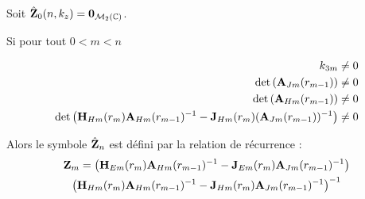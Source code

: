         \begin{thm}
            Soit \(\hat {\mathbf{Z}}_0(n,k_z) = \mathbf{0}_{\mathcal{M}_2(\mathbb C)}\).

            Si pour tout \(0 < m < n\)

            \begin{subequations}
                \begin{align}
                    k_{3m} & \not = 0 \\
                    \det\left(\mathbf{A}_{Jm}(r_{m-1})\right) & \not = 0 \\
                    \det\left(\mathbf{A}_{Hm}(r_{m-1})\right) & \not = 0 \\
                    \det\left(\mathbf{H}_{Hm}(r_{m})\mathbf{A}_{Hm}(r_{m-1})^{-1} - \mathbf{J}_{Hm}(r_{m})(\mathbf{A}_{Jm}(r_{m-1}))^{-1}\right) &\not = 0
                \end{align}
            \end{subequations}

            Alors le symbole \(\hat {\mathbf{Z}}_n\) est défini par la relation de récurrence : 
            \begin{multline}
                \mathbf{Z}_m = \left(\mathbf{H}_{Em}(r_m)\mathbf{A}_{Hm}(r_{m-1})^{-1} - \mathbf{J}_{Em}(r_m)\mathbf{A}_{Jm}(r_{m-1})^{-1}\right) \\
                        \left(\mathbf{H}_{Hm}(r_m)\mathbf{A}_{Hm}(r_{m-1})^{-1} - \mathbf{J}_{Hm}(r_m)\mathbf{A}_{Jm}(r_{m-1})^{-1}\right)^{-1}
            \end{multline}
        \end{thm}

